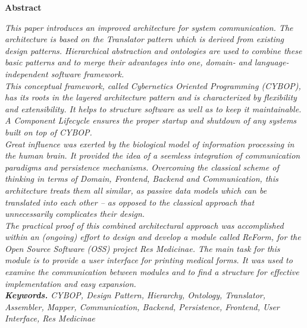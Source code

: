 %
%
%
%
%
%
%

\begin{center}
    \textbf{\large{Abstract}}
\end{center}
\normalsize
\textit{
This paper introduces an improved architecture for system communication.
The architecture is based on the Translator pattern which is derived from
existing design patterns. Hierarchical abstraction and ontologies are used
to combine these basic patterns and to merge their advantages into one,
domain- and language-independent software framework.\\
This conceptual framework, called Cybernetics Oriented Programming (CYBOP),
has its roots in the layered architecture pattern and is characterized by
flexibility and extensibility. It helps to structure software as well as to
keep it maintainable. A Component Lifecycle ensures the proper startup and
shutdown of any systems built on top of CYBOP.\\
Great influence was exerted by the biological model of information processing
in the human brain. It provided the idea of a seemless integration of communication
paradigms and persistence mechanisms. Overcoming the classical scheme of thinking
in terms of Domain, Frontend, Backend and Communication, this architecture treats
them all similar, as passive data models which can be translated into each other
-- as opposed to the classical approach that unnecessarily complicates their design.\\
The practical proof of this combined architectural approach was accomplished
within an (ongoing) effort to design and develop a module called ReForm, for the
Open Source Software (OSS) project Res Medicinae. The main task for this module
is to provide a user interface for printing medical forms. It was used to examine
the communication between modules and to find a structure for effective
implementation and easy expansion.\\
\textbf{Keywords.} CYBOP, Design Pattern, Hierarchy, Ontology, Translator,
Assembler, Mapper, Communication, Backend, Persistence, Frontend, User Interface,
Res Medicinae
} \rm


